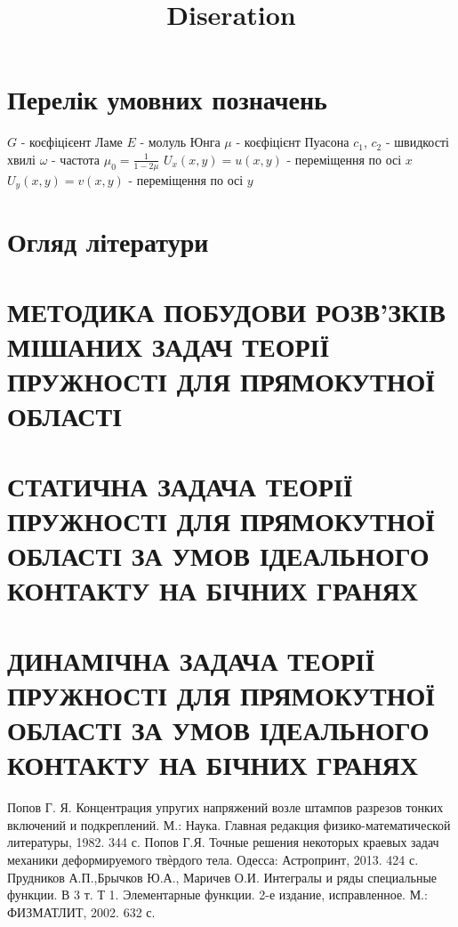 \documentclass[a4paper,10pt]{extarticle}
\title{Diseration}
\author{}
\date{}
\numberwithin{equation}{section}
\begin{document}
\newpage

\renewcommand{\contentsname}{\centering Зміст}
\tableofcontents

\newpage

\section*{\centering Перелік умовних позначень}
$G$ - коєфіцієент Ламе \newline
$E$ - молуль Юнга \newline
$\mu$ - коєфіцієнт Пуасона \newline
$c_1$, $c_2$ - швидкості хвилі \newline
$\omega$ - частота \newline
$\mu_0 = \frac{1}{1 - 2\mu}$ \newline
$U_x(x,y) = u(x,y)$ - переміщення по осі $x$ \newline
$U_y(x,y) = v(x,y)$ - переміщення по осі $y$
\newpage

\section{Огляд літератури}
\newpage

\section{МЕТОДИКА ПОБУДОВИ РОЗВ’ЗКІВ МІШАНИХ ЗАДАЧ ТЕОРІЇ ПРУЖНОСТІ ДЛЯ ПРЯМОКУТНОЇ ОБЛАСТІ}

\newpage

\section{СТАТИЧНА ЗАДАЧА ТЕОРІЇ ПРУЖНОСТІ ДЛЯ ПРЯМОКУТНОЇ ОБЛАСТІ
ЗА УМОВ ІДЕАЛЬНОГО КОНТАКТУ НА БІЧНИХ ГРАНЯХ}

\newpage

\section{ДИНАМІЧНА ЗАДАЧА ТЕОРІЇ ПРУЖНОСТІ ДЛЯ ПРЯМОКУТНОЇ ОБЛАСТІ
ЗА УМОВ ІДЕАЛЬНОГО КОНТАКТУ НА БІЧНИХ ГРАНЯХ}


\begin{thebibliography}{1}
    Попов Г. Я. Концентрация упругих напряжений возле штампов разрезов тонких включений и подкреплений. М.: Наука. Главная редакция физико-математической литературы, 1982. 344 с.
    Попов Г.Я. Точные решения некоторых краевых задач механики деформируемого твѐрдого тела. Одесса: Астропринт, 2013. 424 с.
    Прудников А.П.,Брычков Ю.А., Маричев О.И. Интегралы и ряды специальные функции. В 3 т. Т 1. Элементарные функции. 2-е издание, исправленное. М.: ФИЗМАТЛИТ, 2002. 632 с. 
\end{thebibliography}
\end{document}
